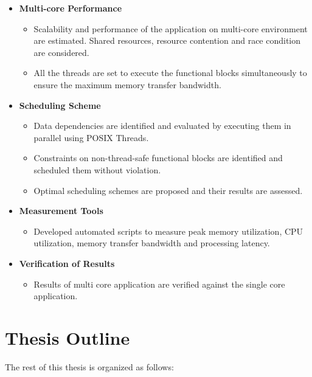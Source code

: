 \begin{itemize}
\item{\bf Multi-core Performance}
  \begin{itemize}
    \item Scalability and performance of the application on multi-core environment are estimated. Shared resources, resource contention and race condition are considered.
    \item All the threads are set to execute the functional blocks simultaneously to ensure the maximum memory transfer bandwidth.
  \end{itemize}
\item {\bf Scheduling Scheme}
 	\begin{itemize}
 	\item Data dependencies are identified and evaluated by executing them in parallel using POSIX Threads.
   	\item Constraints on non-thread-safe functional blocks are identified and scheduled them without violation.
   	\item Optimal scheduling schemes are proposed and their results are assessed.
	\end{itemize}
\item {\bf Measurement Tools}
  \begin{itemize}
      \item Developed automated scripts to measure peak memory utilization, CPU utilization, memory transfer bandwidth and processing latency.
  \end{itemize}
 \item {\bf Verification of Results}
   \begin{itemize}
       \item Results of multi core application are verified against the single core application.
   \end{itemize}
\end{itemize}

\section{Thesis Outline}
\label{sec:intro:outline}

The rest of this thesis is organized as follows:

